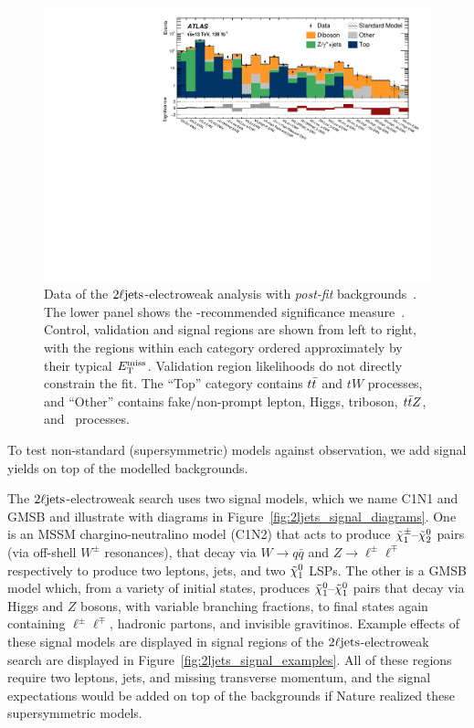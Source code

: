 \begin{figure}[tp]
\centering
\includegraphics[width=\textwidth]{figures/2ljets_summary_log.pdf}
\caption[
Data of the $\twoljets$-electroweak analysis with \emph{post-fit}
backgrounds
]{%
Data of the $\twoljets$-electroweak analysis with \emph{post-fit}
backgrounds~\cite{atlas2022searches}.
The lower panel shows the \atlas-recommended significance
measure~\cite{atlas_significance}.
Control, validation and signal regions are shown from left to right, with the
regions within each category ordered approximately by their typical $E_\mathrm{T}^\mathrm{miss}$.
Validation region likelihoods do not directly constrain the fit.
The ``Top'' category contains $t\bar t$ and $tW$ processes, and
``Other'' contains fake/non-prompt lepton, Higgs, triboson, $t\bar t Z$, and
\topother\ processes.%
}
\label{fig:2ljets_summary}
\end{figure}

To test non-standard (supersymmetric) models against observation,
we add signal yields on top of the modelled backgrounds.

The $\twoljets$-electroweak search uses two signal models,
which we name C1N1 and GMSB and illustrate with diagrams in
Figure~\ref{fig:2ljets_signal_diagrams}.
One is an MSSM chargino-neutralino model (C1N2) that acts to produce
$\tilde\chi^\pm_1\textrm{--}\tilde\chi^0_2$ pairs (via off-shell $W^\pm$ resonances),
that decay via $W\to q\bar q$ and $Z\to \ell^\pm \ell^\mp$
respectively to produce two leptons, jets, and two $\tilde\chi^0_1$ LSPs.
The other is a GMSB model which, from a variety of initial states, produces
$\tilde\chi^0_1\textrm{--}\tilde\chi^0_1$ pairs that decay via Higgs and $Z$
bosons, with variable branching fractions,
to final states again containing $\ell^\pm \ell^\mp$, hadronic partons,
and invisible gravitinos.
Example effects of these signal models are displayed in signal regions of the
$\twoljets$-electroweak search are displayed in
Figure~\ref{fig:2ljets_signal_examples}.
All of these regions require two leptons, jets, and
missing transverse momentum, and the signal expectations would be added on top
of the backgrounds if Nature realized these supersymmetric models.


